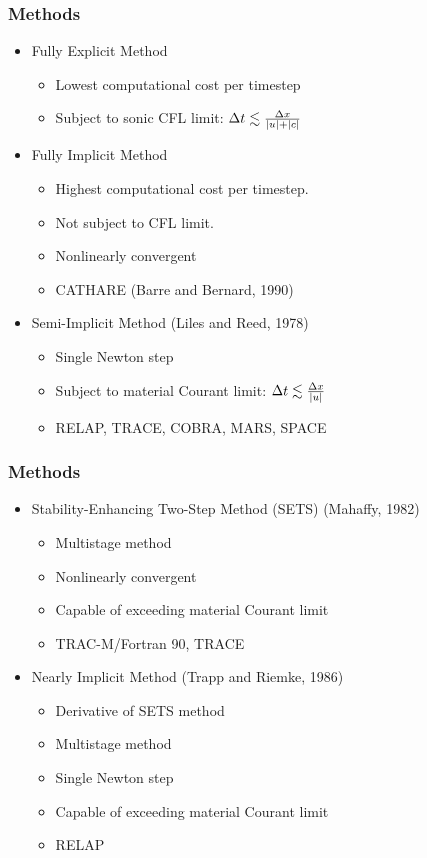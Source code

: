 \documentclass[compress,xcolor=table]{beamer}
\begin{document}
\begin{frame}
\frametitle{Methods}
\begin{itemize}
\item{Fully Explicit Method
\begin{itemize}
\item{Lowest computational cost per timestep}
\item{Subject to sonic CFL limit: $ \dt{} \lesssim \frac{\dx{}}{|u|+|c|}$}
\end{itemize}
}
\item{Fully Implicit Method
\begin{itemize}
\item{Highest computational cost per timestep.}
\item{Not subject to CFL limit.}
\item{Nonlinearly convergent}
\item{CATHARE (Barre and Bernard, 1990)}
\end{itemize}
}
\item{Semi-Implicit Method (Liles and Reed, 1978)
\begin{itemize}
\item{Single Newton step}
\item{Subject to material Courant limit: $ \dt{} \lesssim \frac{\dx{}}{|u|}$}
\item{RELAP, TRACE, COBRA, MARS, SPACE} 
\end{itemize}
}
\end{itemize}
\end{frame}
\begin{frame}
\frametitle{Methods}
\begin{itemize}
\item{Stability-Enhancing Two-Step Method (SETS) (Mahaffy, 1982)
\begin{itemize}
\item{Multistage method}
\item{Nonlinearly convergent}
\item{Capable of exceeding material Courant limit}
\item{TRAC-M/Fortran 90, TRACE}
\end{itemize}
}
\item{Nearly Implicit Method (Trapp and Riemke, 1986)
\begin{itemize}
\item{Derivative of SETS method}
\item{Multistage method}
\item{Single Newton step}
\item{Capable of exceeding material Courant limit}
\item{RELAP}
\end{itemize}
}
\end{itemize}

\end{frame}
\end{document}
